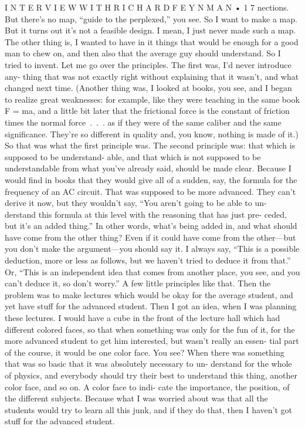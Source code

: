 \documentclass[10pt,oneside]{article}
\begin{document}
I N T E R V I E W  W I T H  R I C H A R D  F E Y N M A N • 1 7 nections. But there’s no map, “guide to the perplexed,” you see. So I want to make a map. But it turns out it’s not a feasible design. I mean, I just never made such a map. The other thing is, I wanted to have in it things that would be enough for a good man to chew on, and then also that the average guy should understand. So I tried to invent. Let me go over the principles. The first was, I’d never introduce any- thing that was not exactly right without explaining that it wasn’t, and what changed next time. (Another thing was, I looked at books, you see, and I began to realize great weaknesses: for example, like they were teaching in the same book F = ma, and a little bit later that the frictional force is the constant of friction times the normal force . . . as if they were of the same caliber and the same significance. They’re so different in quality and, you know, nothing is made of it.) So that was what the first principle was. The second principle was: that which is supposed to be understand- able, and that which is not supposed to be understandable from what you’ve already said, should be made clear. Because I would find in books that they would give all of a sudden, say, the formula for the frequency of an AC circuit. That was supposed to be more advanced. They can’t derive it now, but they wouldn’t say, “You aren’t going to be able to un- derstand this formula at this level with the reasoning that has just pre- ceded, but it’s an added thing.” In other words, what’s being added in, and what should have come from the other thing? Even if it could have come from the other---but you don’t make the argument---you should say it. I always say, “This is a possible deduction, more or less as follows, but we haven’t tried to deduce it from that.” Or, “This is an independent idea that comes from another place, you see, and you can’t deduce it, so don’t worry.” A few little principles like that. Then the problem was to make lectures which would be okay for the average student, and yet have stuff for the advanced student. Then I got an idea, when I was planning these lectures. I would have a cube in the front of the lecture hall which had different colored faces, so that when something was only for the fun of it, for the more advanced student to get him interested, but wasn’t really an essen- tial part of the course, it would be one color face. You see? When there was something that was so basic that it was absolutely necessary to un- derstand for the whole of physics, and everybody should try their best to understand this thing, another color face, and so on. A color face to indi- cate the importance, the position, of the different subjects. Because what I was worried about was that all the students would try to learn all this junk, and if they do that, then I haven’t got stuff for the advanced student.\par
\end{document}
